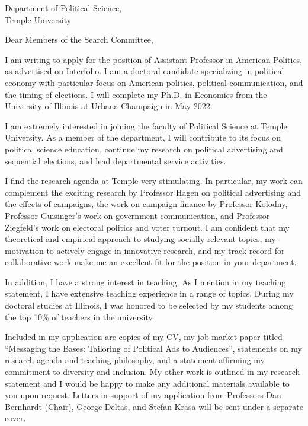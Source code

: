 \documentclass[12pt]{letter}
\begin{document}
\date{}
\begin{letter}{Department of Political Science,\\
Temple University}

\opening{Dear Members of the Search Committee,}

I am writing to apply for the position of Assistant Professor in American Politics, as advertised on Interfolio.
I am a doctoral candidate specializing in political economy with particular focus on American politics, political communication, and the timing of elections.
I will complete my Ph.D. in Economics from the University of Illinois at Urbana-Champaign in May 2022. 

I am extremely interested in joining the faculty of Political Science at Temple University.
As a member of the department, I will contribute to its focus on political science education,
continue my research on political advertising and sequential elections, and lead departmental service activities.

I find the research agenda at Temple very stimulating.
In particular, my work can complement the exciting research by
Professor Hagen on political advertising and the effects of campaigns,
the work on campaign finance by Professor Kolodny,
Professor Guisinger's work on government communication, and Professor Ziegfeld's work on electoral politics and voter turnout.
I am confident that my theoretical and empirical approach to studying socially relevant topics, my motivation to actively engage in innovative research, and my track record for collaborative work make me an excellent fit for the position in your department. 


In addition, I have a strong interest in teaching.
As I mention in my teaching statement, I have extensive teaching experience in a range of topics.
During my doctoral studies at Illinois, I was honored to be selected by my students among the top 10\% of teachers in the university.


Included in my application are copies of my CV, my job market paper titled ``Messaging the Bases: Tailoring of Political Ads to Audiences'',
statements on my research agenda and teaching philosophy, and a statement affirming my commitment to diversity and inclusion.
My other work is outlined in my research statement and I would be happy to make any additional materials available to you upon request.
Letters in support of my application from Professors Dan Bernhardt (Chair), George Deltas, and Stefan Krasa will be sent under a separate cover. 


\end{letter}
\end{document}
